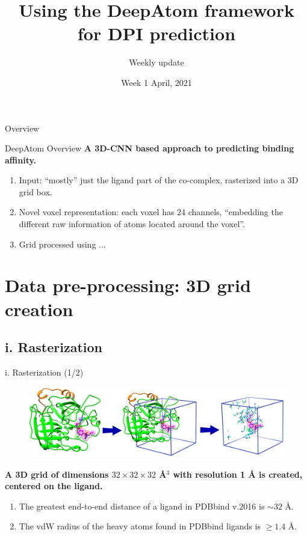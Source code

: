 \documentclass[aspectratio=169,xcolor=dvipsnames]{beamer}
\title[DeepAtom]{Using the DeepAtom framework for DPI prediction}
\subtitle{Weekly update}
\date{Week 1 April, 2021}
\begin{document}
\begin{frame}
    \titlepage
\end{frame}

\begin{frame}{Overview}
    \tableofcontents
\end{frame}

\begin{frame}{DeepAtom Overview}
    \textbf{A 3D-CNN based approach to predicting binding affinity.}
    \vspace{5mm}
    \begin{enumerate}
        \item Input: ``mostly'' just the ligand part of the co-complex,
        rasterized into a 3D grid box.
        \item Novel voxel representation: each voxel has 24 channels, ``embedding the different raw information of atoms located around the voxel''.
        \item Grid processed using ...
    \end{enumerate}
\end{frame}

\section{Data pre-processing: 3D grid creation}
\subsection{i. Rasterization}
\begin{frame}{i. Rasterization (1/2)}
    \begin{figure}
        \includegraphics[width=0.8\linewidth]{images/grid_top}
    \end{figure}
    \textbf{A 3D grid of dimensions $32\times32\times32$ \r{A}$^3$ with resolution 1
    \r{A} is created, centered on the ligand.}
    \vspace{2mm}
    \begin{enumerate}
        \item The greatest end-to-end distance of a ligand in PDBbind v.2016 is $\sim32$ \r{A}.
        \item The vdW radius of the heavy atoms found in PDBbind ligands is
        $\geq 1.4$ \r{A}.
    \end{enumerate}
\end{frame}
\end{document}
